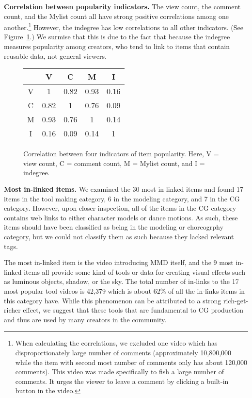 \documentclass[10pt, a4paper]{article}
\begin{document}
{\bf Correlation between popularity indicators.} The view count, the comment count, and the Mylist count all have strong positive correlations among one another.\footnote{When calculating the correlations, we excluded one video which has disproportionately large number of comments (approximately 10,800,000 while the item with second most number of comments only has about 120,000 comments). This video was made specifically to fish a large number of comments. It urges the viewer to leave a comment by clicking a built-in button in the video.} However, the indegree has low correlations to all other indicators. (See Figure~\ref{correlation-table}.) We surmise that this is due to the fact that because the indegree measures popularity among creators, who tend to link to items that contain reusable data, not general viewers. \medskip
\begin{figure}
	\centering
	\begin{tabular}{c|c|c|c|c}
		& V & C & M & I \\
		\hline
		V & 1 & 0.82 & 0.93 & 0.16 \\
		\hline
		C & 0.82 & 1 & 0.76 & 0.09 \\
		\hline
		M & 0.93 & 0.76 & 1 & 0.14 \\
		\hline
		I & 0.16 & 0.09 & 0.14 & 1 \\
	\end{tabular}
	\caption{Correlation between four indicators of item popularity. Here, V = view count, C = comment count, M = Mylist count, and I = indegree.}
	\label{correlation-table}
\end{figure}

{\bf Most in-linked items.} We examined the 30 most in-linked items and found 17 items in the tool making category, 6 in the modeling category, and 7 in the CG category. However, upon closer inspection, all of the items in the CG category contains web links to either character models or dance motions. As such, these items should have been classified as being in the modeling or choreogrphy category, but we could not classify them as such because they lacked relevant tags. 

The most in-linked item is the video introducing MMD itself, and the 9 most in-linked items all provide some kind of tools or data for creating visual effects such as luminous objects, shadow, or the sky. The total number of in-links to the 17 most popular tool videos is 42,379 which is about $62\%$ of all the in-links items in this category have. While this phenomenon can be attributed to a strong rich-get-richer effect, we suggest that these tools that are fundamental to CG production and thus are used by many creators in the community. \medskip
\end{document}
